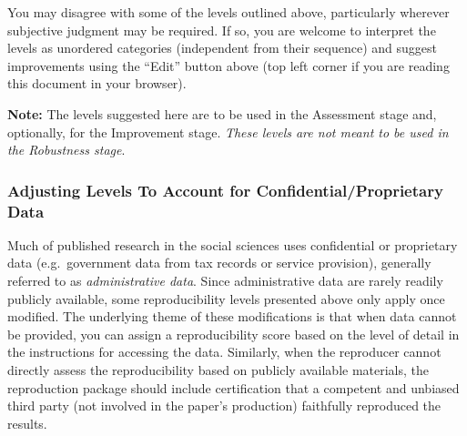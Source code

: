 \documentclass[
]{book}
\begin{document}
You may disagree with some of the levels outlined above, particularly wherever subjective judgment may be required. If so, you are welcome to interpret the levels as unordered categories (independent from their sequence) and suggest improvements using the ``Edit'' button above (top left corner if you are reading this document in your browser).

\textbf{Note:} The levels suggested here are to be used in the Assessment stage and, optionally, for the Improvement stage. \emph{These levels are not meant to be used in the Robustness stage}.

\hypertarget{adjusting-levels-to-account-for-confidentialproprietary-data}{%
\subsubsection*{Adjusting Levels To Account for Confidential/Proprietary Data}\label{adjusting-levels-to-account-for-confidentialproprietary-data}}

Much of published research in the social sciences uses confidential or proprietary data (e.g.~government data from tax records or service provision), generally referred to as \emph{administrative data}. Since administrative data are rarely readily publicly available, some reproducibility levels presented above only apply once modified. The underlying theme of these modifications is that when data cannot be provided, you can assign a reproducibility score based on the level of detail in the instructions for accessing the data. Similarly, when the reproducer cannot directly assess the reproducibility based on publicly available materials, the reproduction package should include certification that a competent and unbiased third party (not involved in the paper's production) faithfully reproduced the results.
\end{document}
